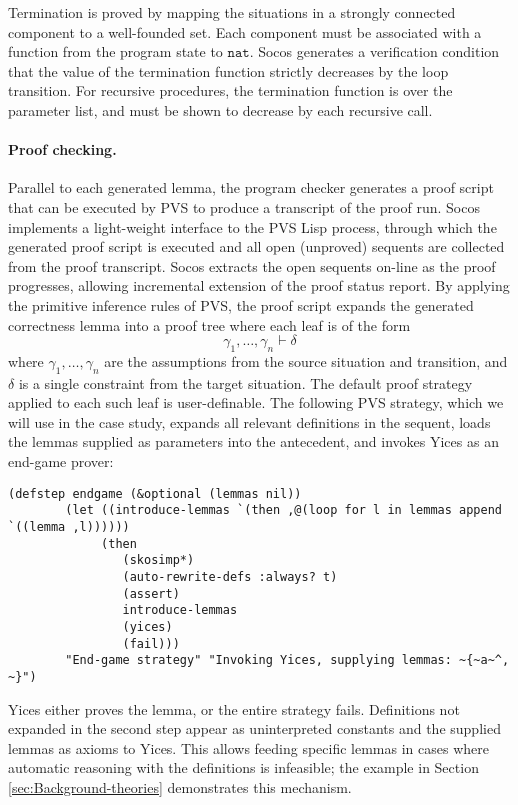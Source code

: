 \documentclass[english,submission]{eptcs}
\begin{document}
Termination is proved by mapping the situations in a strongly connected
component to a well-founded set. Each component must be associated
with a function from the program state to $\mathtt{nat}$. Socos generates
a verification condition that the value of the termination function
strictly decreases by the loop transition. For recursive procedures,
the termination function is over the parameter list, and must be shown
to decrease by each recursive call.


\paragraph{Proof checking.}

Parallel to each generated lemma, the program checker generates a
proof script that can be executed by PVS to produce a transcript of
the proof run. Socos implements a light-weight interface to the PVS
Lisp process, through which the generated proof script is executed
and all open (unproved) sequents are collected from the proof transcript.
Socos extracts the open sequents on-line as the proof progresses,
allowing incremental extension of the proof status report. By applying
the primitive inference rules of PVS, the proof script expands the
generated correctness lemma into a proof tree where each leaf is of
the form 
\[
\gamma_{1},\dots,\gamma_{n}\vdash\delta
\]
where $\gamma_{1},\dots,\gamma_{n}$ are the assumptions from the
source situation and transition, and $\delta$ is a single constraint
from the target situation. The default proof strategy applied to each
such leaf is user-definable. The following PVS strategy, which we
will use in the case study, expands all relevant definitions in the
sequent, loads the lemmas supplied as parameters into the antecedent,
and invokes Yices as an end-game prover:

\noindent \texttt{}
\begin{lstlisting}[basicstyle={\small\ttfamily},columns=fullflexible,frame=lines,tabsize=3]
(defstep endgame (&optional (lemmas nil))
 		(let ((introduce-lemmas `(then ,@(loop for l in lemmas append `((lemma ,l))))))
 			 (then
 				(skosimp*)
 				(auto-rewrite-defs :always? t) 
 				(assert)
 				introduce-lemmas 
 				(yices) 
 				(fail)))
 		"End-game strategy" "Invoking Yices, supplying lemmas: ~{~a~^, ~}")
\end{lstlisting}


\noindent Yices either proves the lemma, or the entire strategy fails.
Definitions not expanded in the second step appear as uninterpreted
constants and the supplied lemmas as axioms to Yices. This allows
feeding specific lemmas in cases where automatic reasoning with the
definitions is infeasible; the example in Section
\ref{sec:Background-theories} demonstrates this mechanism.
\end{document}
